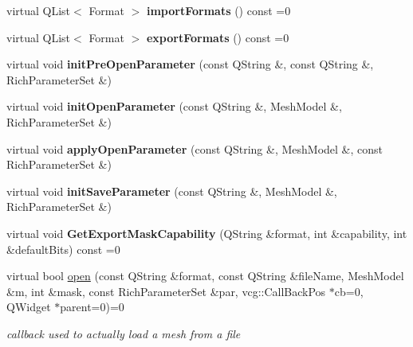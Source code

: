 \begin{DoxyCompactItemize}
\item 
\mbox{\label{class_mesh_i_o_interface_a984bc9548f355e7a3a99a5c7a8f0a8ed}} 
virtual Q\+List$<$ Format $>$ {\bfseries import\+Formats} () const =0
\item 
\mbox{\label{class_mesh_i_o_interface_abb1d30b181bff31c4f452f012b487063}} 
virtual Q\+List$<$ Format $>$ {\bfseries export\+Formats} () const =0
\item 
\mbox{\label{class_mesh_i_o_interface_a0e066f4080b5fc0046f0ef1ce48ea412}} 
virtual void {\bfseries init\+Pre\+Open\+Parameter} (const Q\+String \&, const Q\+String \&, Rich\+Parameter\+Set \&)
\item 
\mbox{\label{class_mesh_i_o_interface_ad0fe601134564e686e4bae36624ac927}} 
virtual void {\bfseries init\+Open\+Parameter} (const Q\+String \&, Mesh\+Model \&, Rich\+Parameter\+Set \&)
\item 
\mbox{\label{class_mesh_i_o_interface_a1de3b9859fbc9307e41478c513704c06}} 
virtual void {\bfseries apply\+Open\+Parameter} (const Q\+String \&, Mesh\+Model \&, const Rich\+Parameter\+Set \&)
\item 
\mbox{\label{class_mesh_i_o_interface_aa6e99c7190decaf42306e1dcb8d0d563}} 
virtual void {\bfseries init\+Save\+Parameter} (const Q\+String \&, Mesh\+Model \&, Rich\+Parameter\+Set \&)
\item 
\mbox{\label{class_mesh_i_o_interface_a9d08c74e5c65cceaee30967a414775d7}} 
virtual void {\bfseries Get\+Export\+Mask\+Capability} (Q\+String \&format, int \&capability, int \&default\+Bits) const =0
\item 
virtual bool \hyperlink{class_mesh_i_o_interface_a3e45aec18c5284346a373b75a8614535}{open} (const Q\+String \&format, const Q\+String \&file\+Name, Mesh\+Model \&m, int \&mask, const Rich\+Parameter\+Set \&par, vcg\+::\+Call\+Back\+Pos $\ast$cb=0, Q\+Widget $\ast$parent=0)=0
\begin{DoxyCompactList}\small\item\em callback used to actually load a mesh from a file \end{DoxyCompactList}\item 

\end{DoxyCompactItemize}
